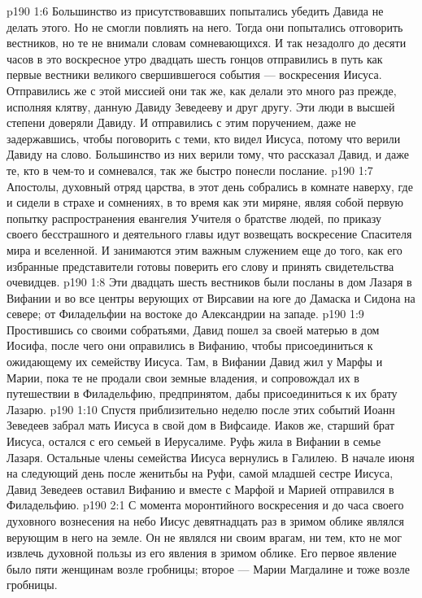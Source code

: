 \vs p190 1:6 \pc Большинство из присутствовавших попытались убедить Давида не делать этого. Но не смогли повлиять на него. Тогда они попытались отговорить вестников, но те не внимали словам сомневающихся. И так незадолго до десяти часов в это воскресное утро двадцать шесть гонцов отправились в путь как первые вестники великого свершившегося события --- воскресения Иисуса. Отправились же с этой миссией они так же, как делали это много раз прежде, исполняя клятву, данную Давиду Зеведееву и друг другу. Эти люди в высшей степени доверяли Давиду. И отправились с этим поручением, даже не задержавшись, чтобы поговорить с теми, кто видел Иисуса, потому что верили Давиду на слово. Большинство из них верили тому, что рассказал Давид, и даже те, кто в чем\hyp{}то и сомневался, так же быстро понесли послание.
\vs p190 1:7 \pc Апостолы, духовный отряд царства, в этот день собрались в комнате наверху, где и сидели в страхе и сомнениях, в то время как эти миряне, являя собой первую попытку распространения евангелия Учителя о братстве людей, по приказу своего бесстрашного и деятельного главы идут возвещать воскресение Спасителя мира и вселенной. И занимаются этим важным служением еще до того, как его избранные представители готовы поверить его слову и принять свидетельства очевидцев.
\vs p190 1:8 \pc Эти двадцать шесть вестников были посланы в дом Лазаря в Вифании и во все центры верующих от Вирсавии на юге до Дамаска и Сидона на севере; от Филадельфии на востоке до Александрии на западе.
\vs p190 1:9 Простившись со своими собратьями, Давид пошел за своей матерью в дом Иосифа, после чего они оправились в Вифанию, чтобы присоединиться к ожидающему их семейству Иисуса. Там, в Вифании Давид жил у Марфы и Марии, пока те не продали свои земные владения, и сопровождал их в путешествии в Филадельфию, предпринятом, дабы присоединиться к их брату Лазарю.
\vs p190 1:10 Спустя приблизительно неделю после этих событий Иоанн Зеведеев забрал мать Иисуса в свой дом в Вифсаиде. Иаков же, старший брат Иисуса, остался с его семьей в Иерусалиме. Руфь жила в Вифании в семье Лазаря. Остальные члены семейства Иисуса вернулись в Галилею. В начале июня на следующий день после женитьбы на Руфи, самой младшей сестре Иисуса, Давид Зеведеев оставил Вифанию и вместе с Марфой и Марией отправился в Филадельфию.
\vs p190 2:1 С момента моронтийного воскресения и до часа своего духовного вознесения на небо Иисус девятнадцать раз в зримом облике являлся верующим в него на земле. Он не являлся ни своим врагам, ни тем, кто не мог извлечь духовной пользы из его явления в зримом облике. Его первое явление было пяти женщинам возле гробницы; второе --- Марии Магдалине и тоже возле гробницы.

